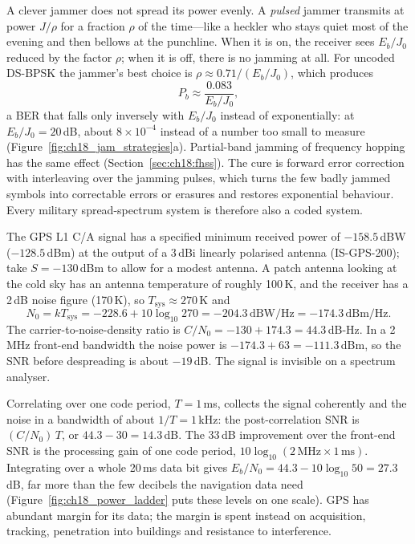 A clever jammer does not spread its power evenly. A \emph{pulsed} jammer transmits at power
$J/\rho$ for a fraction $\rho$ of the time---like a heckler who stays quiet most of the evening
and then bellows at the punchline. When it is on, the receiver sees $E_b/J_0$
reduced by the factor $\rho$; when it is off, there is no jamming at all. For uncoded DS-BPSK
the jammer's best choice is $\rho\approx0.71/(E_b/J_0)$, which produces
\begin{equation}
P_b\approx\frac{0.083}{E_b/J_0},
\end{equation}
a BER that falls only inversely with $E_b/J_0$ instead of exponentially: at
$E_b/J_0=20$\,dB, about $8\times10^{-4}$ instead of a number too small to measure
(Figure~\ref{fig:ch18_jam_strategies}a).
Partial-band jamming of frequency hopping has the same effect (Section~\ref{sec:ch18:fhss}).
The cure is forward error correction with interleaving over the jamming pulses, which turns
the few badly jammed symbols into correctable errors or erasures and restores exponential
behaviour. Every military spread-spectrum system is therefore also a coded system.


\begin{worked}
The GPS L1 C/A signal has a specified minimum received power of $-158.5$\,dBW
($-128.5$\,dBm) at the output of a 3\,dBi linearly polarised antenna (IS-GPS-200); take
$S=-130$\,dBm to allow for a modest antenna. A patch antenna looking at the cold sky has an
antenna temperature of roughly 100\,K, and the receiver has a 2\,dB noise figure
(170\,K), so $T_{\text{sys}}\approx270$\,K and
\[
N_0=kT_{\text{sys}}=-228.6+10\log_{10}270=-204.3\,\text{dBW/Hz}=-174.3\,\text{dBm/Hz}.
\]
The carrier-to-noise-density ratio is $C/N_0=-130+174.3=44.3$\,dB-Hz. In a
2\,MHz front-end bandwidth the noise power is $-174.3+63=-111.3$\,dBm, so the SNR before
despreading is about $-19$\,dB. The signal is invisible on a spectrum analyser.

Correlating over one code period, $T=1$\,ms, collects the signal coherently and the noise
in a bandwidth of about $1/T=1$\,kHz: the post-correlation SNR is
$(C/N_0)\,T$, or $44.3-30=14.3$\,dB. The 33\,dB improvement over the front-end SNR is the
processing gain of one code period, $10\log_{10}(2\,\text{MHz}\times1\,\text{ms})$. Integrating over a
whole 20\,ms data bit gives $E_b/N_0=44.3-10\log_{10}50=27.3$\,dB, far more than the few
decibels the navigation data need (Figure~\ref{fig:ch18_power_ladder} puts these levels on one
scale). GPS has abundant margin for its data; the margin is
spent instead on acquisition, tracking, penetration into buildings and resistance to
interference.
\end{worked}

